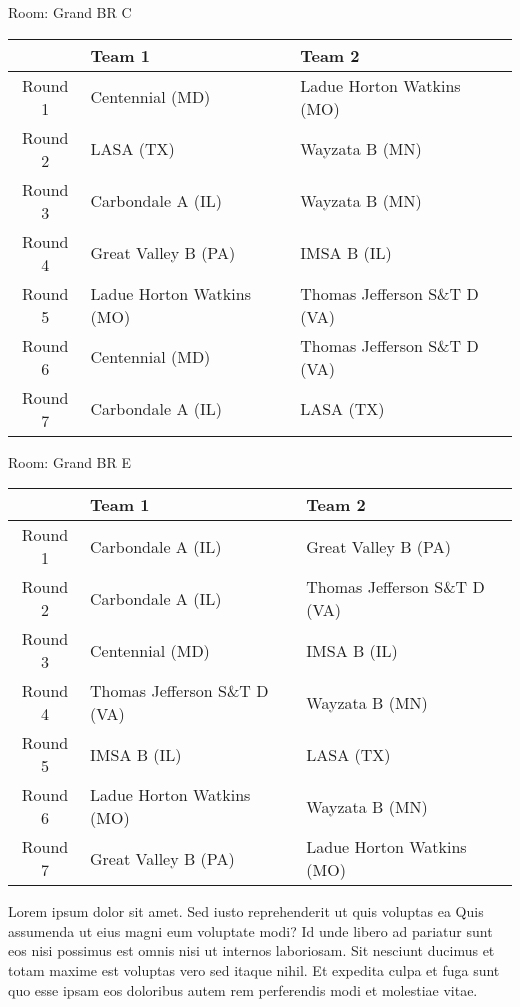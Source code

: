 \documentclass{article}%
\begin{document}
\vspace*{8pt}%
\linebreak%
\begin{flushleft}%
\begin{Large}%
Room: Grand BR C%
\end{Large}%
\end{flushleft}%
\begin{tabularx}{\textwidth}{|c|Y|Y|}%
\hline%
&Team 1&Team 2\\%
\hline%
Round 1&Centennial (MD)&Ladue Horton Watkins (MO)\\%
Round 2&LASA (TX)&Wayzata B (MN)\\%
Round 3&Carbondale A (IL)&Wayzata B (MN)\\%
Round 4&Great Valley B (PA)&IMSA B (IL)\\%
Round 5&Ladue Horton Watkins (MO)&Thomas Jefferson S\&T D (VA)\\%
Round 6&Centennial (MD)&Thomas Jefferson S\&T D (VA)\\%
Round 7&Carbondale A (IL)&LASA (TX)\\%
\hline%
\end{tabularx}%
\vspace*{8pt}%
\linebreak%
\begin{flushleft}%
\begin{Large}%
Room: Grand BR E%
\end{Large}%
\end{flushleft}%
\begin{tabularx}{\textwidth}{|c|Y|Y|}%
\hline%
&Team 1&Team 2\\%
\hline%
Round 1&Carbondale A (IL)&Great Valley B (PA)\\%
Round 2&Carbondale A (IL)&Thomas Jefferson S\&T D (VA)\\%
Round 3&Centennial (MD)&IMSA B (IL)\\%
Round 4&Thomas Jefferson S\&T D (VA)&Wayzata B (MN)\\%
Round 5&IMSA B (IL)&LASA (TX)\\%
Round 6&Ladue Horton Watkins (MO)&Wayzata B (MN)\\%
Round 7&Great Valley B (PA)&Ladue Horton Watkins (MO)\\%
\hline%
\end{tabularx}%
\vspace*{8pt}%
\linebreak%
\newline%
Lorem ipsum dolor sit amet. Sed iusto reprehenderit ut quis voluptas ea Quis assumenda ut eius magni eum voluptate modi? Id unde libero ad pariatur sunt eos nisi possimus est omnis nisi ut internos laboriosam. Sit nesciunt ducimus et totam maxime est voluptas vero sed itaque nihil. Et expedita culpa et fuga sunt quo esse ipsam eos doloribus autem rem perferendis modi et molestiae vitae.\newline%
\end{document}
